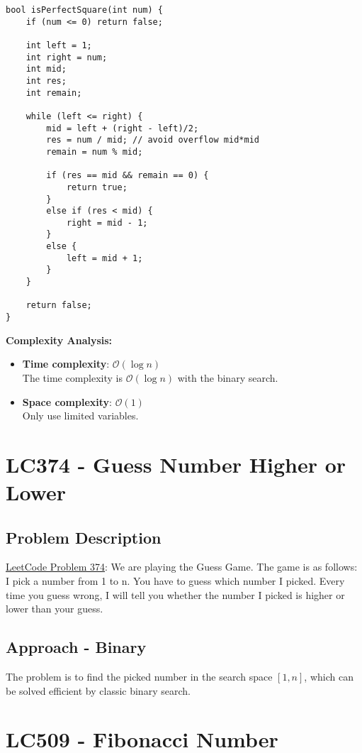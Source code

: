\documentclass[justified]{tufte-book}
\begin{document}
\begin{lstlisting}
bool isPerfectSquare(int num) {
    if (num <= 0) return false;
    
    int left = 1;
    int right = num;
    int mid;
    int res;
    int remain;
    
    while (left <= right) {
        mid = left + (right - left)/2;
        res = num / mid; // avoid overflow mid*mid
        remain = num % mid;
        
        if (res == mid && remain == 0) {
            return true;
        }
        else if (res < mid) {
            right = mid - 1;
        }
        else {
            left = mid + 1;
        }
    }
    
    return false;
}
\end{lstlisting}
\noindent \textbf{Complexity Analysis:}
\begin{itemize}
    \item \textbf{Time complexity}: $\mathcal{O}(\log n)$ \\
    The time complexity is $\mathcal{O}(\log n)$ with the binary search.
    \item \textbf{Space complexity}: $\mathcal{O}(1)$ \\
    Only use limited variables.
\end{itemize}


\section{LC374 - Guess Number Higher or Lower} 
\subsection{Problem Description}
\href{https://leetcode.com/problems/guess-number-higher-or-lower/}{LeetCode Problem 374}: We are playing the Guess Game. The game is as follows: I pick a number from 1 to n. You have to guess which number I picked. Every time you guess wrong, I will tell you whether the number I picked is higher or lower than your guess.

\subsection{Approach - Binary}
The problem is to find the picked number in the search space $[1, n]$, which can be solved efficient by classic binary search.

\section{LC509 - Fibonacci Number} \label{sec:lc509_fibonacci}
\end{document}
